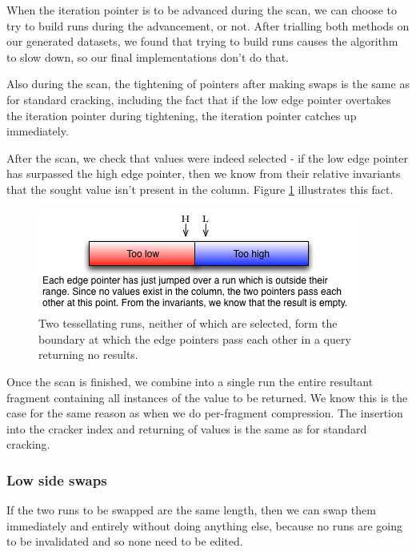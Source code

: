 When the iteration pointer is to be advanced during the scan, we can choose to try to build runs during the advancement, or not. After trialling both methods on our generated datasets, we found that trying to build runs causes the algorithm to slow down, so our final implementations don't do that.

Also during the scan, the tightening of pointers after making swaps is the same as for standard cracking, including the fact that if the low edge pointer overtakes the iteration pointer during tightening, the iteration pointer catches up immediately.

After the scan, we check that values were indeed selected - if the low edge pointer has surpassed the high edge pointer, then we know from their relative invariants that the sought value isn't present in the column. Figure \ref{fig:edge_pointers_pass_each_other} illustrates this fact.

\begin{figure}[H]
  \centering
  \includegraphics[]{images/d13_edge_pointers_pass_each_other}
  \caption{Two tessellating runs, neither of which are selected, form the boundary at which the edge pointers pass each other in a query returning no results.}
  \label{fig:edge_pointers_pass_each_other}
\end{figure}

Once the scan is finished, we combine into a single run the entire resultant fragment containing all instances of the value to be returned. We know this is the case for the same reason as when we do per-fragment compression. The insertion into the cracker index and returning of values is the same as for standard cracking.

\subsubsection{Low side swaps}

If the two runs to be swapped are the same length, then we can swap them immediately and entirely without doing anything else, because no runs are going to be invalidated and so none need to be edited.

